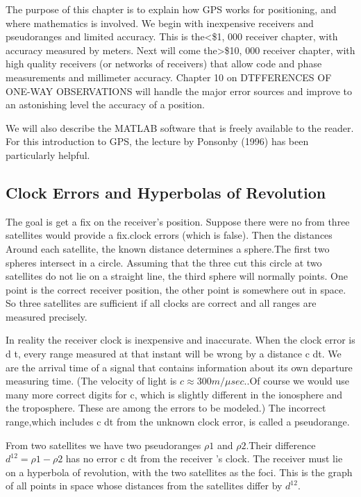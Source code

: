 The purpose of this chapter is to explain how GPS works for positioning, and where mathematics is involved. We begin with inexpensive receivers and pseudoranges and limited accuracy. This is the<\$1, 000 receiver chapter, with accuracy measured by meters. Next will come the>\$10, 000 receiver chapter, with high quality receivers (or networks of receivers) that allow code and phase measurements and millimeter accuracy. Chapter 10 on DTFFERENCES OF ONE-WAY OBSERVATIONS will handle the major error sources and improve to an astonishing level the accuracy of a position.

We will also describe the MATLAB software that is freely available to the reader. For this introduction to GPS, the lecture by Ponsonby (1996) has been particularly helpful.


	\subsection{Clock Errors and Hyperbolas of Revolution}
	The goal is get a fix on the receiver's position. Suppose there were no from three satellites would provide a fix.clock errors (which is false). Then the distances Around each satellite, the known distance determines a sphere.The first two spheres intersect in a circle. Assuming that the three cut this circle at two satellites do not lie on a straight line, the third sphere will normally points. One point is the correct receiver position, the other point is somewhere out in space. So three satellites are sufficient if all clocks are correct and all ranges are measured precisely.
	
	In reality the receiver clock is inexpensive and inaccurate. When the clock error is d t, every range measured at that instant will be wrong by a distance c dt. We are the arrival time of a signal that contains information about its own departure measuring time. (The velocity of light is $c\approx300m/\mu sec.$.Of course we would use many more correct digits for c, which is slightly different in the ionosphere and the troposphere. These are among the errors to be modeled.) The incorrect range,which includes c dt from the unknown clock error, is called a pseudorange.
	
	From two satellites we have two pseudoranges $\rho 1$ and $\rho 2$.Their difference $d^{12}=\rho 1 - \rho 2$ has no error c dt from the receiver 's clock. The receiver must lie on a hyperbola of revolution, with the two satellites as the foci. This is the graph of all points in space whose distances from the satellites differ by $d^{12}$.

